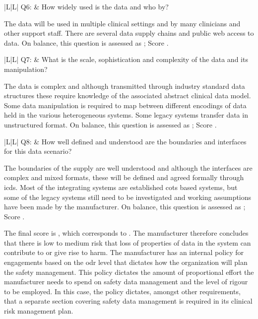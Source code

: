 \addtocounter{table}{-1} %
\begin{longtable*}[H]
	{|L{}|L{}|}
	\hline
	Q6: & How widely used is the data and who by?\\
	\hline
\end{longtable*}

The data will be used in multiple clinical settings and by many clinicians and other support staff. There are several data supply chains and public web access to data. On balance, this question is assessed as ; Score .

\addtocounter{table}{-1} %
\begin{longtable*}[H]
	{|L{}|L{}|}
	\hline
	Q7: & What is the scale, sophistication and complexity of the data and its manipulation?\\
	\hline
\end{longtable*}

The data is complex and although transmitted through industry standard data structures these require knowledge of the associated abstract clinical data model. Some data manipulation is required to map between different encodings of data held in the various heterogeneous systems. Some legacy systems transfer data in unstructured format. On balance, this question is assessed as ; Score .

\addtocounter{table}{-1} %
\begin{longtable*}[H]
	{|L{}|L{}|}
	\hline
	Q8: & How well defined and understood are the boundaries and interfaces for this data scenario?\\
	\hline
\end{longtable*}
The boundaries of the supply are well understood and although the interfaces are complex and mixed formats, these will be defined and agreed formally through \glspl{icd}. Most of the integrating systems are established \gls{cots} based systems, but some of the legacy systems still need to be investigated and working assumptions have been
made by the manufacturer. On balance, this question is assessed as ; Score .

The final score is , which corresponds to . The manufacturer therefore concludes that there is low to medium risk that loss of properties of data in the system can contribute to or give rise to harm. The manufacturer has an internal policy for engagements based on the \gls{odr} level that dictates how the organization will plan the \cbstart safety management\cbend. This policy dictates the amount of proportional effort the manufacturer needs to spend on safety data management and the level of rigour to be employed. In this case, the policy dictates, amongst other requirements, that a separate section covering safety data management is required in its clinical risk management plan.

